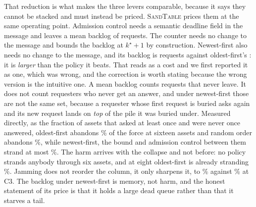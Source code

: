 \documentclass[11pt]{article}
\newcommand{\sandtable}{\textsc{SandTable}}
\begin{document}
That reduction is what makes the three levers comparable, because it says they cannot be stacked and
must instead be priced. \sandtable{} prices them at the same operating point. Admission control needs
a semantic deadline field in the message and leaves a mean backlog of \LvBackAdmit{} requests. The
counter needs no change to the message and bounds the backlog at $k^{\star}+1$ by construction.
Newest-first also needs no change to the message, and its backlog is \LvBackLifo{} requests against
oldest-first's \LvBackFifo{}: it is \emph{larger} than the policy it beats. That reads as a cost and
we first reported it as one, which was wrong, and the correction is worth stating because the wrong
version is the intuitive one. A mean backlog counts requests that never leave. It does not count
requesters who never get an answer, and under newest-first those are not the same set, because a
requester whose first request is buried asks again and its new request lands on \emph{top} of the
pile it was buried under. Measured directly, as the fraction of assets that asked at least once and
were never once answered, oldest-first abandons \KpClearStarveFifo\% of the force at sixteen assets
and random order abandons \KpClearStarveRand\%, while newest-first, the bound and admission control
between them strand at most \KpClearStarveFair\%. The harm arrives with the collapse and not before:
no policy strands anybody through six assets, and at eight oldest-first is already stranding
\KpClearStarveOnsetHi\%. Jamming does not reorder the column, it only sharpens it, to
\KpJamStarveFifo\% against \KpJamStarveFair\% at C3. The backlog under newest-first is memory, not
harm, and the honest statement of its price is that it holds a large dead queue rather than that it
starves a tail.
\end{document}
